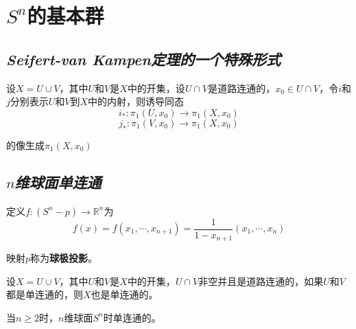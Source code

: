 \section{$S^n$的基本群}

\subsection*{\textsl{Seifert-van Kampen定理的一个特殊形式}}

\begin{mdframed}
    \begin{theorem}
        设$X=U\cup V$，其中$U$和$V$是$X$中的开集，设$U\cap V$是道路连通的，$x_0\in U\cap V$，令$i$和$j$分别表示$U$和$V$到$X$中的内射，则诱导同态
        \begin{equation}
            i_*:\pi_1(U,x_0)\rightarrow \pi_1(X,x_0)
        \end{equation}
        \begin{equation}
            j_*:\pi_1(V,x_0)\rightarrow \pi_1(X,x_0)
        \end{equation}

        的像生成$\pi_1(X,x_0)$
    \end{theorem}
\end{mdframed}

\subsection*{\textsl{$n$维球面单连通}}

定义$f:(S^n-p)\rightarrow \mathbb{R}^n$为
\begin{equation}
    f(x)=f(x_1,\cdots,x_{n+1})=\frac{1}{1-x_{n+1}}(x_1,\cdots,x_n)
\end{equation}

映射$p$称为\textbf{球极投影}。

\begin{mdframed}
    \begin{corollary}
        设$X=U\cup V$，其中$U$和$V$是$X$中的开集，$U\cap V$非空并且是道路连通的，如果$U$和$V$都是单连通的，则$X$也是单连通的。
    \end{corollary}
\end{mdframed}

\begin{mdframed}
    \begin{theorem}
        当$n\geqslant 2$时，$n$维球面$S^n$时单连通的。
    \end{theorem}
\end{mdframed}
